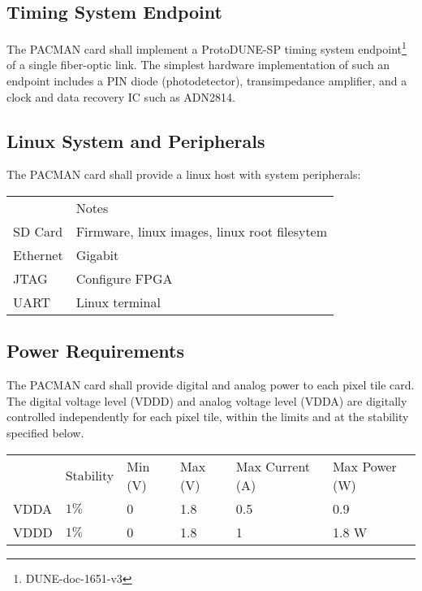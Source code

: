 \documentclass[12pt]{article}
\begin{document}
\subsection{Timing System Endpoint}

The PACMAN card shall implement a ProtoDUNE-SP timing system
endpoint\footnote{DUNE-doc-1651-v3} of a single fiber-optic link.  The
simplest hardware implementation of such an endpoint includes a PIN
diode (photodetector), transimpedance amplifier, and a clock and data
recovery IC such as ADN2814.

\subsection{Linux System and Peripherals}

The PACMAN card shall provide a linux host with system peripherals:
\begin{center}
\begin{tabular}{ll}
         & Notes \\
SD Card  & Firmware, linux images, linux root filesytem\\
Ethernet & Gigabit\\
JTAG     & Configure FPGA\\
UART     & Linux terminal\\
\end{tabular}
\end{center}

\subsection{Power Requirements}

The PACMAN card shall provide digital and analog power to each pixel
tile card.  The digital voltage level (VDDD) and analog voltage level
(VDDA) are digitally controlled independently for each pixel tile, within the limits and at the stability specified below.
\begin{center}
\begin{tabular}{llllll}
      & Stability & Min (V) & Max (V) & Max Current (A) & Max Power (W) \\
VDDA  & $1\%$ & 0 & 1.8 & 0.5 & 0.9\\
VDDD  & $1\%$ & 0 & 1.8 & 1   & 1.8 W\\
\end{tabular}
\end{center}
\end{document}
